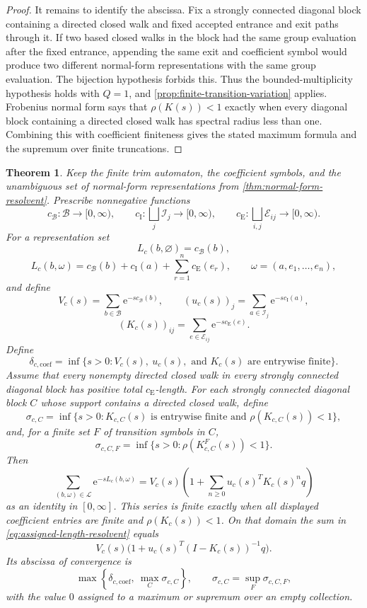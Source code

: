 \documentclass[11pt]{article}
\newtheorem{theorem}{Theorem}[section]
\theoremstyle{definition}
\newcommand{\coef}{\mathrm{coef}}
\newcommand{\e}{\mathrm e}
\begin{document}
\begin{proof}
It remains to identify the abscissa.  Fix a strongly connected diagonal block containing a directed closed walk and fixed accepted
entrance and exit paths through it.  If two based closed walks in the block had the same group
evaluation after the fixed entrance, appending the same exit and coefficient symbol would
produce two different normal-form representations with the same group evaluation.  The
bijection hypothesis forbids this.  Thus the bounded-multiplicity hypothesis holds with
$Q=1$, and \cref{prop:finite-transition-variation} applies.  Frobenius normal form says that
$\rho(K(s))<1$ exactly when every diagonal block containing a directed closed walk has spectral radius less than one.  Combining this
with coefficient finiteness gives the stated maximum formula and the supremum over finite truncations.
\end{proof}

\begin{theorem}
\label{thm:assigned-length-resolvent}
Keep the finite trim automaton, the coefficient symbols, and the unambiguous set of normal-form
representations from \cref{thm:normal-form-resolvent}.  Prescribe nonnegative functions
\[
 c_{\mathcal B}:\mathcal B\to[0,\infty),\qquad
 c_{\mathrm I}:\bigsqcup_j\mathcal I_j\to[0,\infty),\qquad
 c_{\mathrm E}:\bigsqcup_{i,j}\mathcal E_{ij}\to[0,\infty).
\]
For a representation set
\[
 L_c(b,\varnothing)=c_{\mathcal B}(b),
\]
\[
 L_c(b,\omega)=c_{\mathcal B}(b)+c_{\mathrm I}(a)
 +\sum_{r=1}^n c_{\mathrm E}(e_r),
 \qquad \omega=(a,e_1,\ldots,e_n),
\]
and define
\[
 V_c(s)=\sum_{b\in\mathcal B}\e^{-s c_{\mathcal B}(b)},\qquad
 (u_c(s))_j=\sum_{a\in\mathcal I_j}\e^{-s c_{\mathrm I}(a)},
\]
\[
 (K_c(s))_{ij}=\sum_{e\in\mathcal E_{ij}}\e^{-s c_{\mathrm E}(e)}.
\]
Define
\[
 \delta_{c,\coef}=\inf\{s>0:V_c(s),\ u_c(s),\text{ and }K_c(s)
 \text{ are entrywise finite}\}.
\]
Assume that every nonempty directed closed walk in every strongly connected diagonal block has
positive total $c_{\mathrm E}$-length.  For each strongly connected diagonal block $C$ whose
support contains a directed closed walk, define
\[
 \sigma_{c,C}=\inf\{s>0:K_{c,C}(s)\text{ is entrywise finite and }
 \rho(K_{c,C}(s))<1\},
\]
and, for a finite set $F$ of transition symbols in $C$,
\[
 \sigma_{c,C,F}=\inf\{s>0:\rho(K^F_{c,C}(s))<1\}.
\]
Then
\begin{equation}\label{eq:assigned-length-resolvent}
 \sum_{(b,\omega)\in\mathcal L}\e^{-sL_c(b,\omega)}
 =V_c(s)\left(1+\sum_{n\ge0}u_c(s)^T K_c(s)^nq\right)
\end{equation}
as an identity in $[0,\infty]$.  This series is finite exactly when all displayed coefficient
entries are finite and $\rho(K_c(s))<1$. On that domain the sum in
\eqref{eq:assigned-length-resolvent} equals
\[
 V_c(s)\bigl(1+u_c(s)^T(I-K_c(s))^{-1}q\bigr).
\]
Its abscissa of convergence is
\[
 \max\left\{\delta_{c,\coef},\ \max_C\sigma_{c,C}\right\},
 \qquad
 \sigma_{c,C}=\sup_F\sigma_{c,C,F},
\]
with the value $0$ assigned to a maximum or supremum over an empty collection.
\end{theorem}
\end{document}
